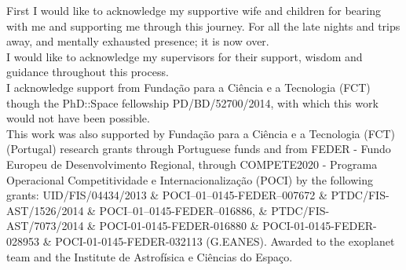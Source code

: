 \begin{acknowledgements}
First I would like to acknowledge my supportive wife and children for bearing with me and supporting me through this journey. For all the late nights and trips away, and mentally exhausted presence; it is now over.\\

I would like to acknowledge my supervisors for their support, wisdom and guidance throughout this process.\\

I acknowledge support from Funda\c{c}\~ao para a Ci\^encia e a Tecnologia (FCT) though the PhD::Space fellowship PD/BD/52700/2014, with which this work would not have been possible.\\

This work was also supported by Funda\c{c}\~ao para a Ci\^encia e a Tecnologia (FCT) (Portugal) research grants through Portuguese funds and from FEDER - Fundo Europeu de Desenvolvimento Regional, through COMPETE2020 - Programa Operacional Competitividade e Internacionalização (POCI) by the following grants:
UID/FIS/04434/2013 \&
POCI--01--0145-FEDER--007672 \&
PTDC/FIS-AST/1526/2014 \&
POCI--01--0145-FEDER--016886, \&
PTDC/FIS-AST/7073/2014 \&
POCI-01-0145-FEDER-016880 \&
POCI-01-0145-FEDER-028953 \&
POCI-01-0145-FEDER-032113 (G.EANES).
Awarded to the exoplanet team and the Institute de Astrof\'{i}sica e Ci\^encias do Espa\c{c}o.

\end{acknowledgements}
